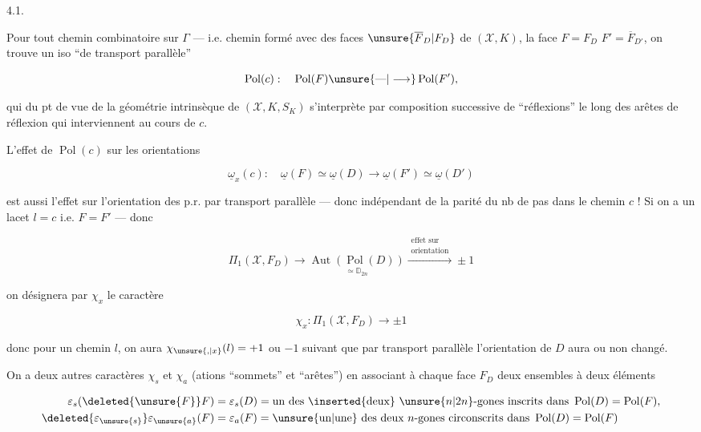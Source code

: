 

4.1.

Pour tout  chemin  combinatoire sur $\Gamma$ --- i.e. chemin formé avec des faces $\unsure{\overline F_D|F_D}$ de $(\mathcal X,K)$,  la face $F=F_D$  $F'=\overline F_{D'}$, on trouve un iso ``de transport parallèle''

\[ \operatorname{Pol}(c):\quad \operatorname{Pol}(F)\unsure{\text{---}|\longrightarrow}\operatorname{Pol}(F'), \]

qui du pt de vue de la géométrie intrinsèque de $(\mathcal X,K,S_K)$ s'interprète par composition successive de ``réflexions'' le long des arêtes de réflexion qui interviennent au cours de $c$.

L'effet de $\operatorname{Pol}(c)$ sur les orientations

\[ \underline{\omega}_x(c):\quad \underline{\omega}(F)\simeq\underline{\omega}(D)\longrightarrow\underline{\omega}(F')\simeq\underline{\omega}(D') \]

est aussi l'effet sur l'orientation des p.r. par transport parallèle --- donc  indépendant de la parité du nb de pas dans le chemin $c$ ! Si on a un lacet \deleted{\unsure{\ell}} $l=c$ i.e. $F=F'$ --- donc

\[ \Pi_1(\mathcal X,F_D)\longrightarrow\underset{\simeq\mathbb D_{2n}}{\operatorname{Aut}(\operatorname{Pol}(D))}\xrightarrow{\substack{\text{effet sur}\\\text{orientation}}}\pm1 \]

on désignera par $\chi_x$ le caractère 

\[ \chi_x:\Pi_1(\mathcal X,F_D)\longrightarrow\pm1 \]

donc pour un chemin $l$, on aura $\chi_{\unsure{,|x}}(l)=+1$ ou $-1$ suivant que par transport parallèle l'orientation de $D$ aura ou non changé. 

On a deux autres caractères $\chi_s$ et $\chi_a$ (ations ``sommets'' et ``arêtes'') en associant à chaque face $F_D$  deux ensembles à deux éléments

\[ \begin{aligned}
\varepsilon_s(\deleted{\unsure{F}}F)&=\varepsilon_s(D)=\text{un des \inserted{deux} }\unsure{n|2n}\text{-gones inscrits dans }\operatorname{Pol}(D)=\operatorname{Pol}(F),\\
\deleted{\varepsilon_{\unsure{s}}}\varepsilon_{\unsure{a}}(F)&=\varepsilon_a(F)=\text{\unsure{un|une} des deux }n\text{-gones circonscrits dans }\operatorname{Pol}(D)=\operatorname{Pol}(F)
\end{aligned} \]
